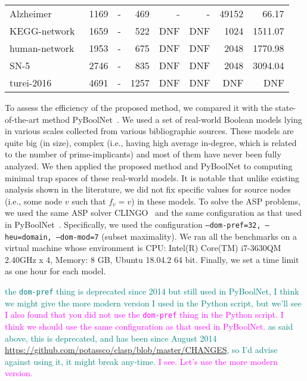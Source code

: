 \documentclass[runningheads]{llncs}
\newcommand{\vangiang}[1]{\textcolor{magenta}{#1}}
\newcommand{\sylvain}[1]{\textcolor{teal}{#1}}
\begin{document}
\begin{table}[!htb]
\begin{tabular}{lrrrrrrr}
    Alzheimer~\cite{aghamiri2020automated} & 1169 & - & 469 & - & - & 49152 & 66.17 \\
    KEGG-network~\cite{DBLP:journals/bmcsb/Kwon16} & 1659 & - & 522 & DNF & DNF & 1024 & 1511.07 \\
    human-network~\cite{kim2011reduction} & 1953 & - & 675 & DNF & DNF & 2048 & 1770.98 \\ \midrule
    
    SN-5~\cite{kim2013rmod} & 2746 & - & 835 & DNF & DNF & 2048 & 3094.04 \\
    turei-2016~\cite{lee2019signal} & 4691 & - & 1257 & DNF & DNF & DNF & DNF \\
    
    \bottomrule
  \end{tabular}

\end{table}

To assess the efficiency of the proposed method, we compared it with the state-of-the-art method PyBoolNet~\cite{klarner2017pyboolnet}.
We used a set of real-world Boolean models lying in various scales collected from various bibliographic sources.
These models are quite big (in size), complex (i.e., having high average in-degree, which is related to the number of prime-implicants) and most of them have never been fully analyzed.
We then applied the proposed method and PyBoolNet to computing minimal trap spaces of these real-world models.
It is notable that unlike existing analysis shown in the literature, we did not fix specific values for source nodes (i.e., some node \(v\) such that \(f_v = v\)) in these models.
To solve the ASP problems, we used the same ASP solver CLINGO~\cite{DBLP:journals/aicom/GebserKKOSS11} and the same configuration as that used in PyBoolNet~\cite{klarner2015computing}.
Specifically, we used the configuration \texttt{--dom-pref=32, --heu=domain, --dom-mod=7} (subset maximality). We ran all the benchmarks on a virtual machine whose environment is CPU: Intel(R) Core(TM) i7-3630QM 2.40GHz x 4, Memory: 8 GB, Ubuntu 18.04.2 64 bit. Finally, we set a time limit as one hour for each model.

\sylvain{the \texttt{dom-pref} thing is deprecated since 2014 but still used in PyBoolNet, I think we might give the more modern version I used in the Python script, but we'll see}
\vangiang{I also found that you did not use the \texttt{dom-pref} thing in the Python script. I think we should use the same configuration as that used in PyBoolNet.}
\sylvain{as said above, this is deprecated, and has been since August 2014 \url{https://github.com/potassco/clasp/blob/master/CHANGES}, so I'd advise against using it, it might break any-time.}
\vangiang{I see. Let's use the more modern version.}
\end{document}
